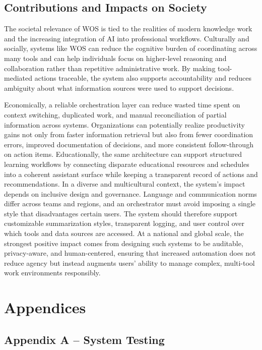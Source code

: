 \documentclass[conference]{IEEEtran}
\begin{document}
\subsection{Contributions and Impacts on Society}
The societal relevance of WOS is tied to the realities of modern knowledge work and the increasing integration of AI into professional workflows. Culturally and socially, systems like WOS can reduce the cognitive burden of coordinating across many tools and can help individuals focus on higher-level reasoning and collaboration rather than repetitive administrative work. By making tool-mediated actions traceable, the system also supports accountability and reduces ambiguity about what information sources were used to support decisions.

Economically, a reliable orchestration layer can reduce wasted time spent on context switching, duplicated work, and manual reconciliation of partial information across systems. Organizations can potentially realize productivity gains not only from faster information retrieval but also from fewer coordination errors, improved documentation of decisions, and more consistent follow-through on action items. Educationally, the same architecture can support structured learning workflows by connecting disparate educational resources and schedules into a coherent assistant surface while keeping a transparent record of actions and recommendations.
In a diverse and multicultural context, the system’s impact depends on inclusive design and governance. Language and communication norms differ across teams and regions, and an orchestrator must avoid imposing a single style that disadvantages certain users. The system should therefore support customizable summarization styles, transparent logging, and user control over which tools and data sources are accessed. At a national and global scale, the strongest positive impact comes from designing such systems to be auditable, privacy-aware, and human-centered, ensuring that increased automation does not reduce agency but instead augments users’ ability to manage complex, multi-tool work environments responsibly.
\section*{Appendices}

\subsection*{Appendix A -- System Testing}
\end{document}
